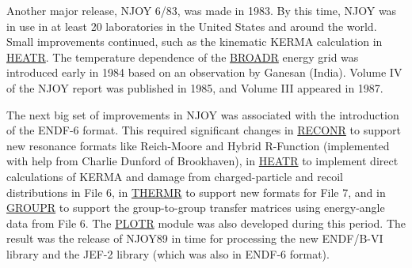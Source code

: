 Another major release, NJOY 6/83, was made in 1983.
By this time, NJOY was in use in at least 20 laboratories in the United States
and around the world.  Small improvements continued, such as the kinematic
KERMA calculation in
\hyperlink{sHEATRhy}{HEATR}.  The
temperature dependence of the \hyperlink{sBROADRhy}{BROADR}
energy grid was introduced early in 1984 based on an
observation by Ganesan (India).  Volume IV of the NJOY report was
published in 1985, and Volume III appeared in 1987.

The next big set of improvements in NJOY was associated with the
introduction of the ENDF-6 format.  This
required significant changes in \hyperlink{sRECONRhy}{RECONR}
 to support new resonance formats like
Reich-Moore and Hybrid R-Function
 (implemented with help from Charlie
Dunford of Brookhaven), in
\hyperlink{sHEATRhy}{HEATR} to implement
direct calculations of KERMA and
damage from charged-particle and recoil distributions in
File 6, in \hyperlink{sTHERMRhy}{THERMR}
to support new formats for File 7, and in
\hyperlink{sGROUPRhy}{GROUPR} to
support the group-to-group transfer matrices using
energy-angle data from
File 6.  The \hyperlink{sPLOTRhy}{PLOTR}
module was also developed during
this period.  The result was the release of NJOY89\cite{NJ89}
 in time for processing the new
ENDF/B-VI library and the
JEF-2  library (which was also in ENDF-6 format).

